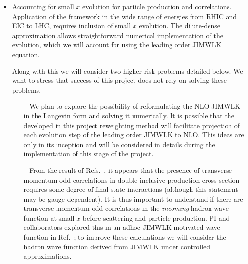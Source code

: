 \begin{itemize}
			\item Accounting for small $x$ evolution for particle production and correlations. 
				Application of the framework in the wide range of energies from RHIC and EIC to LHC, requires 
				inclusion of small $x$ evolution. The dilute-dense approximation allows straightforward 
				numerical implementation  of the evolution, which we will account for using the leading order 
				JIMWLK equation. 

				Along with this we will consider two higher risk problems detailed below. 
				We want to stress that success of this project does not rely on solving these problems. 
				\begin{itemize}
					\item[--]
				We  plan to explore the possibility of reformulating the NLO JIMWLK in the Langevin form and 
				solving it numerically. It is possible that the developed in this project reweighting method 
				will facilitate projection of each evolution step of the leading order JIMWLK to NLO. This ideas are only 
				in its inception and will be considered in details during the implementation of this stage of the project.
					\item[--]
				From the result of Refs.~\cite{McLerran:2016snu,Kovchegov:2018jun}, it appears that 
				the presence of transverse momentum odd correlations in double inclusive production cross section 
				requires some degree of final state interactions (although 
				this statement may be gauge-dependent). It is thus important to understand if there
				are transverse momentum odd correlations in the {\it incoming} hadron wave function at small $x$
				before scattering and particle production. PI and collaborators  explored  this in an adhoc  JIMWLK-motivated 
				wave function in Ref.~\cite{Kovner:2016jfp}; to improve  these calculations  we will consider 
				the hadron wave function derived from JIMWLK under controlled approximations.  
				\end{itemize}
			

\end{itemize}
